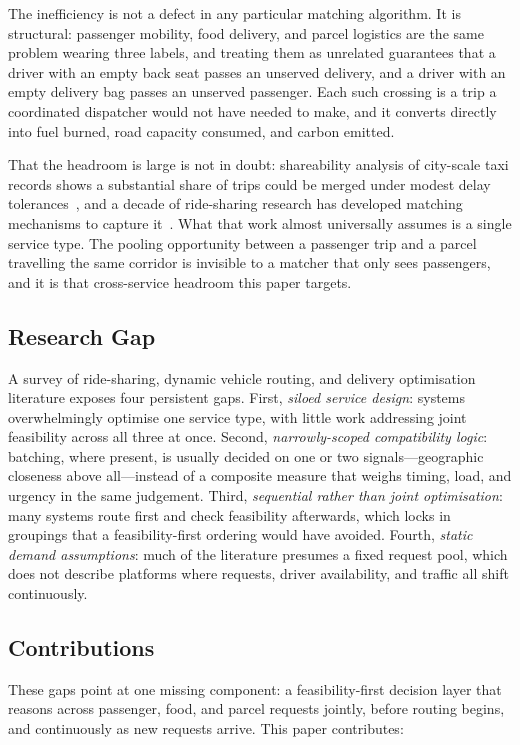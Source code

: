 \documentclass[conference]{IEEEtran}
\begin{document}
The inefficiency is not a defect in any particular matching algorithm. It is
structural: passenger mobility, food delivery, and parcel logistics are the
same problem wearing three labels, and treating them as unrelated guarantees
that a driver with an empty back seat passes an unserved delivery, and a
driver with an empty delivery bag passes an unserved passenger. Each such
crossing is a trip a coordinated dispatcher would not have needed to make,
and it converts directly into fuel burned, road capacity consumed, and
carbon emitted.

That the headroom is large is not in doubt: shareability analysis of
city-scale taxi records shows a substantial share of trips could be merged
under modest delay tolerances~\cite{santi2014}, and a decade of ride-sharing
research has developed matching mechanisms to capture
it~\cite{furuhata2013}. What that work almost universally assumes is a single
service type. The pooling opportunity between a passenger trip and a parcel
travelling the same corridor is invisible to a matcher that only sees
passengers, and it is that cross-service headroom this paper targets.

\subsection{Research Gap}
A survey of ride-sharing, dynamic vehicle routing, and delivery optimisation
literature exposes four persistent gaps. First, \emph{siloed service design}:
systems overwhelmingly optimise one service type, with little work addressing
joint feasibility across all three at once. Second, \emph{narrowly-scoped
compatibility logic}: batching, where present, is usually decided on one or
two signals---geographic closeness above all---instead of a composite measure
that weighs timing, load, and urgency in the same judgement. Third, \emph{sequential rather than joint optimisation}:
many systems route first and check feasibility afterwards, which locks in
groupings that a feasibility-first ordering would have avoided. Fourth,
\emph{static demand assumptions}: much of the literature presumes a fixed
request pool, which does not describe platforms where requests, driver
availability, and traffic all shift continuously.

\subsection{Contributions}
These gaps point at one missing component: a feasibility-first decision layer
that reasons across passenger, food, and parcel requests jointly, before
routing begins, and continuously as new requests arrive. This paper
contributes:
\end{document}
